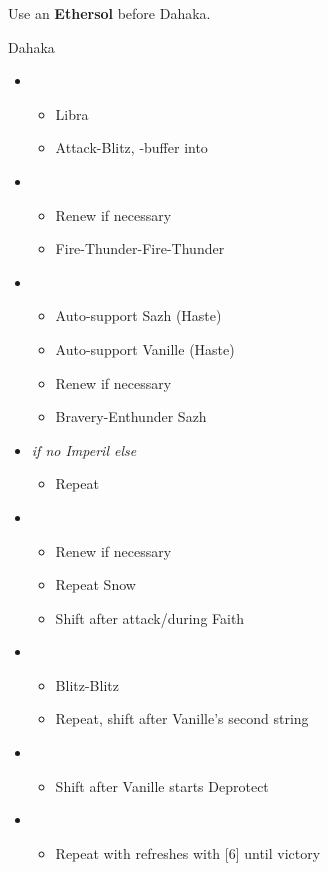 Use an \textbf{Ethersol} before Dahaka.
\vfill
\begin{battle}[1:30]{Dahaka}
		\begin{itemize}
			\item \second
			      \begin{itemize}
				      \item Libra
				      \item Attack-Blitz, \rav-buffer into
			      \end{itemize}
			\item \fifth
			      \begin{itemize}
				      \item Renew if necessary
				      \item Fire-Thunder-Fire-Thunder
			      \end{itemize}
			\item \first
			      \begin{itemize}
				      \item Auto-support Sazh (Haste)
				      \item Auto-support Vanille (Haste)
				      \item Renew if necessary
				      \item Bravery-Enthunder Sazh
			      \end{itemize}
			\item \fifth \textit{ if no Imperil else } \third
			      \begin{itemize}
				      \item Repeat
			      \end{itemize}
			\item \first
			      \begin{itemize}
				      \item Renew if necessary
				      \item Repeat Snow
				      \item Shift after attack/during Faith
			      \end{itemize}
			\item \second
			      \begin{itemize}
				      \item Blitz-Blitz
				      \item Repeat, shift after Vanille's second string
			      \end{itemize}
			\item \fifth
			      \begin{itemize}
				      \item Shift after Vanille starts Deprotect
			      \end{itemize}
			\item \fourth
			      \begin{itemize}
				      \item Repeat with refreshes with [6] until victory
			      \end{itemize}
		\end{itemize}
	\end{battle}

